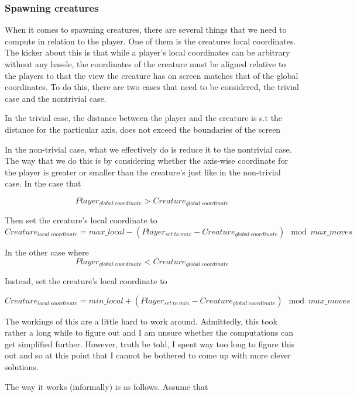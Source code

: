 \documentclass{report}
\begin{document}
\subsubsection{Spawning creatures}
When it comes to spawning creatures, there are several things that we need to compute in relation to the player. One of them is the creatures local coordinates. The kicker about this is that while a player's local coordinates can be arbitrary without any hassle, the coordinates of the creature must be aligned relative to the players to that the view the creature has on screen matches that of the global coordinates. To do this, there are two cases that need to be considered, the trivial case and the nontrivial case. \newline

In the trivial case, the distance between the player and the creature is s.t the distance for the particular axis, does not exceed the boundaries of the screen \newline

In the non-trivial case, what we effectively do is reduce it to the nontrivial case. The way that we do this is by considering whether the axis-wise coordinate for the player is greater or smaller than the creature's just like in the non-trivial case. In the case that

\[ Player_{global  \:coordinate} > Creature_{global \: coordinate} \]

Then set the creature's local coordinate to
\[ Creature_{local \: coordinate} = max\_local - (Player_{set \: to \: max} - Creature_{global \: coordinate} ) \mod  max\_moves  \]


In the other case where 
\[ Player_{global  \:coordinate} < Creature_{global \: coordinate} \]

Instead, set the creature's local coordinate to

\[ Creature_{local \: coordinate} = min\_local + (Player_{set \: to \: min} - Creature_{global \: coordinate} ) \mod  max\_moves  \]

The workings of this are a little hard to work around. Admittedly, this took rather a long while to figure out and I am unsure whether the computations can get simplified further. However, truth be told, I spent way too long to figure this out and so at this point that I cannot be bothered to come up with more clever solutions. \newline

The way it works (informally) is as follows. Assume that
\end{document}
